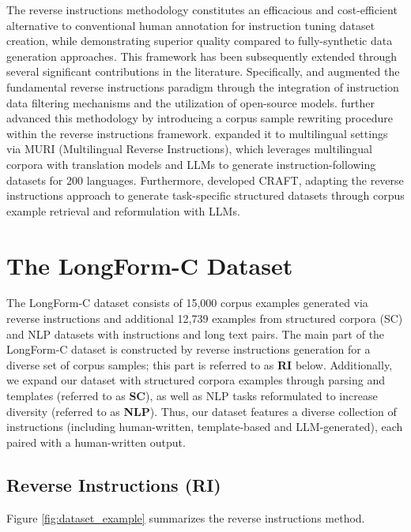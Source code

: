   The reverse instructions methodology constitutes an efficacious and cost-efficient alternative to conventional human annotation for instruction tuning dataset creation, while demonstrating superior quality compared to fully-synthetic data generation approaches. This framework has been subsequently extended through several significant contributions in the literature. Specifically, \citet{wang2023harnessing} and \citet{li2023selfalignment} augmented the fundamental reverse instructions paradigm through the integration of instruction data filtering mechanisms and the utilization of open-source models. \citet{chen2023tegit} further advanced this methodology by introducing a corpus sample rewriting procedure within the reverse instructions framework. \citet{koksal2024muri} expanded it to multilingual settings via MURI (Multilingual Reverse Instructions), which leverages multilingual corpora with translation models and LLMs to generate instruction-following datasets for 200 languages. Furthermore, \citet{ziegler2024craft} developed CRAFT, adapting the reverse instructions approach to generate task-specific structured datasets through corpus example retrieval and reformulation with LLMs.

	\section{The LongForm-C Dataset}
	\label{sec:dataset}
The LongForm-C dataset  consists of 15,000 corpus examples generated via reverse instructions and additional 12,739 examples from structured corpora (SC) and NLP datasets with instructions and long text pairs. The main part of the LongForm-C dataset is constructed by reverse instructions  generation for a diverse set of corpus samples; this part is referred to as \textbf{RI} below. Additionally, we expand our dataset with structured corpora examples through parsing and templates (referred to as \textbf{SC}), as well as NLP tasks reformulated to increase diversity (referred to as \textbf{NLP}). Thus, our dataset features a diverse collection of instructions (including human-written, template-based and LLM-generated), each paired with a human-written output.

	\subsection{Reverse Instructions (RI)}

        Figure \ref{fig:dataset_example} summarizes the reverse instructions method.


